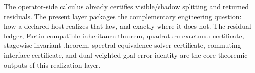 \begin{remark}
\label{rem:realization-certificates-as-tools}
The operator-side calculus already certifies visible/shadow splitting and
returned residuals. The present layer packages the complementary engineering
question: how a declared host realizes that law, and exactly where it does not.
The residual ledger, Fortin-compatible inheritance theorem, quadrature
exactness certificate, stagewise invariant theorem, spectral-equivalence
solver certificate, commuting-interface certificate, and dual-weighted
goal-error identity are the core theoremic outputs of this realization layer.
\end{remark}
